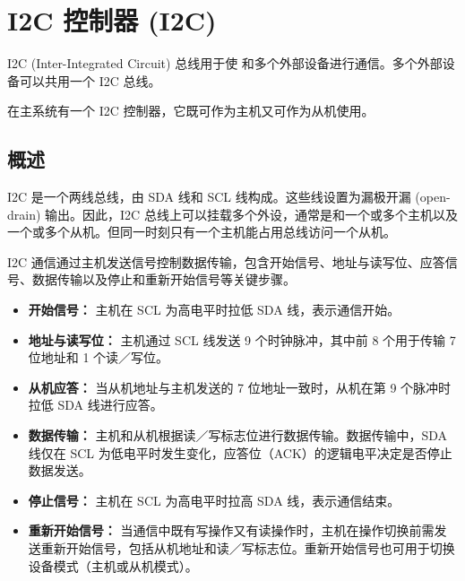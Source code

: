 \documentclass[main\_\_CN.tex]{subfiles}
\begin{document}

\ifglobal
\else
    \listoftodos
    {\let\clearpage\relax \listofdonetodos}
    \tableofcontents
\fi



\hypertarget{i2c}{}
\chapter{I2C 控制器 (I2C)}
\label{mod:i2c}

I2C (Inter-Integrated Circuit) 总线用于使 \chipname{} 和多个外部设备进行通信。多个外部设备可以共用一个 I2C 总线。

\chipname{} 在主系统有一个 I2C 控制器，它既可作为主机又可作为从机使用。

\section{概述}

I2C 是一个两线总线，由 SDA 线和 SCL 线构成。这些线设置为漏极开漏 (open-drain) 输出。因此，I2C 总线上可以挂载多个外设，通常是和一个或多个主机以及一个或多个从机。但同一时刻只有一个主机能占用总线访问一个从机。

I2C 通信通过主机发送信号控制数据传输，包含开始信号、地址与读写位、应答信号、数据传输以及停止和重新开始信号等关键步骤。

\begin{itemize}
    \item \textbf{开始信号：}
    主机在 SCL 为高电平时拉低 SDA 线，表示通信开始。

    \item \textbf{地址与读写位：}
    主机通过 SCL 线发送 9 个时钟脉冲，其中前 8 个用于传输 7 位地址和 1 个读／写位。

    \item \textbf{从机应答：}
    当从机地址与主机发送的 7 位地址一致时，从机在第 9 个脉冲时拉低 SDA 线进行应答。

    \item \textbf{数据传输：}
    主机和从机根据读／写标志位进行数据传输。数据传输中，SDA 线仅在 SCL 为低电平时发生变化，应答位（ACK）的逻辑电平决定是否停止数据发送。

    \item \textbf{停止信号：}
    主机在 SCL 为高电平时拉高 SDA 线，表示通信结束。

    \item \textbf{重新开始信号：}
    当通信中既有写操作又有读操作时，主机在操作切换前需发送重新开始信号，包括从机地址和读／写标志位。重新开始信号也可用于切换设备模式（主机或从机模式）。
\end{itemize}
\end{document}
